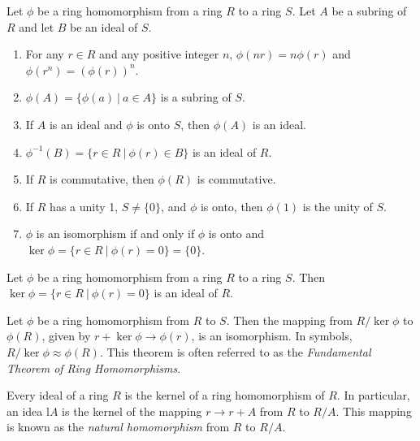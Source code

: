 
\begin{theorem}
	Let $\phi$ be a ring homomorphism from a ring $R$ to a ring $S$. Let $A$ be a subring of $R$ and let $B$ be an ideal of $S$.
	\begin{enumerate}
		\item For any $r \in R$ and any positive integer $n$, $\phi(nr) = n\phi(r)$ and $\phi(r^n) = (\phi(r))^n$.
		\item $\phi(A) = \{\phi(a)\ \vert\ a \in A\}$ is a subring of $S$.
		\item If $A$ is an ideal and $\phi$ is onto $S$, then $\phi(A)$ is an ideal.
		\item $\phi^{-1}(B) = \{r \in R\ \vert\ \phi(r) \in B\}$ is an ideal of $R$.
		\item If $R$ is commutative, then $\phi(R)$ is commutative.
		\item If $R$ has a unity 1, $S \neq \{0\}$, and $\phi$ is onto, then $\phi(1)$ is the unity of $S$.
		\item $\phi$ is an isomorphism if and only if $\phi$ is onto and $\ker \phi = \{r \in R\ \vert\ \phi(r) = 0\} = \{0\}$.
	\end{enumerate}
\end{theorem}

\begin{theorem}
	Let $\phi$ be a ring homomorphism from a ring $R$ to a ring $S$. Then $\ker \phi = \{r \in R\ \vert\ \phi(r) = 0\}$ is an ideal of $R$.
\end{theorem}

\begin{theorem}
	Let $\phi$ be a ring homomorphism from $R$ to $S$. Then the mapping from $R/\ker \phi$ to $\phi(R)$, given by $r + \ker \phi \to \phi(r)$, is an isomorphism. In symbols, $R/\ker\phi\approx\phi(R)$. This theorem is often referred to as the \textit{Fundamental Theorem of Ring Homomorphisms}.
\end{theorem}

\begin{theorem}
	Every ideal of a ring $R$ is the kernel of a ring homomorphism of $R$. In particular, an idea l$A$ is the kernel of the mapping $r \to r + A$ from $R$ to $R/A$. This mapping is known as the \textit{natural homomorphism} from $R$ to $R/A$.
\end{theorem}

